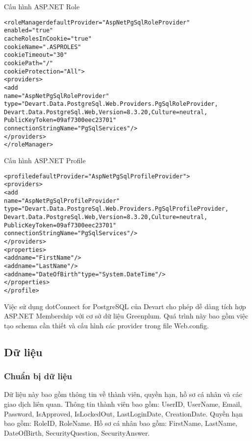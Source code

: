 Cấu hình ASP.NET Role
\begin{mdframed}[backgroundcolor=white, linecolor=black, roundcorner=5pt]
\begin{alltt}
<roleManager defaultProvider="AspNetPgSqlRoleProvider"
             enabled="true"
             cacheRolesInCookie="true"
             cookieName=".ASPROLES"
             cookieTimeout="30"
             cookiePath="/"
             cookieProtection="All">
  <providers>
    <add
      name="AspNetPgSqlRoleProvider"
      type="Devart.Data.PostgreSql.Web.Providers.PgSqlRoleProvider,
            Devart.Data.PostgreSql.Web, Version=8.3.20, Culture=neutral,
            PublicKeyToken=09af7300eec23701"
      connectionStringName="PgSqlServices" />
  </providers>
</roleManager>
\end{alltt}
\end{mdframed}

Cấu hình ASP.NET Profile 
\begin{mdframed}[backgroundcolor=white, linecolor=black, roundcorner=5pt]
\begin{alltt}
<profile defaultProvider="AspNetPgSqlProfileProvider">
  <providers>
    <add
      name="AspNetPgSqlProfileProvider"
      type="Devart.Data.PostgreSql.Web.Providers.PgSqlProfileProvider,
            Devart.Data.PostgreSql.Web, Version=8.3.20, Culture=neutral,
            PublicKeyToken=09af7300eec23701"
      connectionStringName="PgSqlServices" />
  </providers>
  <properties>
    <add name="FirstName" />
    <add name="LastName" />
    <add name="DateOfBirth" type="System.DateTime"/>
  </properties>
</profile>
\end{alltt}
\end{mdframed}

Việc sử dụng dotConnect for PostgreSQL của Devart cho phép dễ dàng tích hợp ASP.NET Membership với cơ sở dữ liệu Greenplum. Quá trình này bao gồm việc tạo schema cần thiết và cấu hình các provider trong file Web.config.


\subsection{Dữ liệu}

\subsubsection{Chuẩn bị dữ liệu}

Dữ liệu này bao gồm thông tin về thành viên, quyền hạn, hồ sơ cá nhân và các giao dịch liên quan. Thông tin thành viên bao gồm: UserID, UserName, Email, Password, IsApproved, IsLockedOut, LastLoginDate, CreationDate. Quyền hạn bao gồm: RoleID, RoleName. Hồ sơ cá nhân bao gồm: FirstName, LastName, DateOfBirth, SecurityQuestion, SecurityAnswer.

